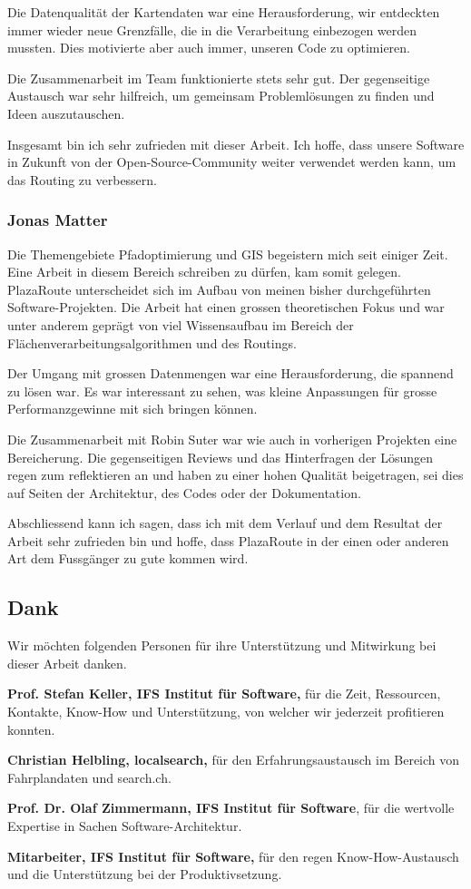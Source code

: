 Die Datenqualität der Kartendaten war eine Herausforderung, wir entdeckten immer wieder neue Grenzfälle, die in die Verarbeitung einbezogen werden mussten. Dies motivierte aber auch immer, unseren Code zu optimieren.

Die Zusammenarbeit im Team funktionierte stets sehr gut. Der gegenseitige Austausch war sehr hilfreich, um gemeinsam Problemlösungen zu finden und Ideen auszutauschen.

Insgesamt bin ich sehr zufrieden mit dieser Arbeit. Ich hoffe, dass unsere Software in Zukunft von der Open-Source-Community weiter verwendet werden kann, um das Routing zu verbessern.


\subsubsection{Jonas Matter}
\label{Persönliche Berichte:Jonas Matter}
Die Themengebiete Pfadoptimierung und GIS begeistern mich seit einiger Zeit. Eine Arbeit in diesem Bereich schreiben zu dürfen, kam somit gelegen. PlazaRoute unterscheidet sich im Aufbau von meinen bisher durchgeführten Software-Projekten. Die Arbeit hat einen grossen theoretischen Fokus und war unter anderem geprägt von viel Wissensaufbau im Bereich der Flächenverarbeitungsalgorithmen und des Routings. 

Der Umgang mit grossen Datenmengen war eine Herausforderung, die spannend zu lösen war. Es war interessant zu sehen, was kleine Anpassungen für grosse Performanzgewinne mit sich bringen können.

Die Zusammenarbeit mit Robin Suter war wie auch in vorherigen Projekten eine Bereicherung. Die gegenseitigen Reviews und das Hinterfragen der Lösungen regen zum reflektieren an und haben zu einer hohen Qualität beigetragen, sei dies auf Seiten der Architektur, des Codes oder der Dokumentation.

Abschliessend kann ich sagen, dass ich mit dem Verlauf und dem Resultat der Arbeit sehr zufrieden bin und hoffe, dass PlazaRoute in der einen oder anderen Art dem Fussgänger zu gute kommen wird.


\subsection{Dank}
\label{sub:Dank}

Wir möchten folgenden Personen für ihre Unterstützung und Mitwirkung bei dieser Arbeit danken.

\textbf{Prof. Stefan Keller, IFS Institut für Software,} für die Zeit, Ressourcen, Kontakte, Know-How und Unterstützung, von welcher wir jederzeit profitieren konnten.

\textbf{Christian Helbling, localsearch,} für den Erfahrungsaustausch im Bereich von Fahrplandaten und search.ch.

\textbf{Prof. Dr. Olaf Zimmermann, IFS Institut für Software}, für die wertvolle Expertise in Sachen Software-Architektur.

\textbf{Mitarbeiter, IFS Institut für Software,} für den regen Know-How-Austausch und die Unterstützung bei der Produktivsetzung.
